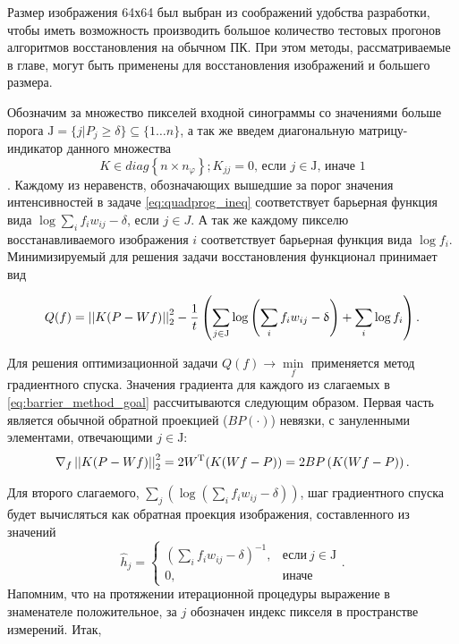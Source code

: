 Размер изображения 64х64 был выбран из соображений удобства разработки, чтобы иметь возможность производить большое количество тестовых прогонов алгоритмов восстановления на обычном ПК.
При этом методы, рассматриваемые в главе, могут быть применены для восстановления изображений и большего размера.


Обозначим за множество пикселей входной синограммы со значениями больше порога $\mathrm J = \{j | P_j \geq \delta \} \subseteq \{1 \dots n\}$, а так же введем диагональную матрицу-индикатор данного множества 
$$
K \in diag\left\{n \times n_\varphi\right\}; K_{jj} = 0 \text{, если\ } j \in \mathrm J \text{, иначе\ } 1
$$.
Каждому из неравенств, обозначающих вышедшие за порог значения интенсивностей в задаче \eqref{eq:quadprog_ineq} соответствует барьерная функция вида $\log{\sum_i f_{i} w_{ij} - \delta}$, если $j \in J$. 
А так же каждому пикселю восстанавливаемого изображения $i$ соответствует барьерная функция вида $\log{f_i}$.
Минимизируемый для решения задачи восстановления функционал принимает вид

\begin{equation}
\label{eq:barrier_method_goal}
  Q(f) = \left|\left| K(P - Wf) \right|\right|_2^2 - 
  \frac 1 t \left( 
    \sum_{j \in \mathrm J}{
      \log{\left(\sum_i {f_i w_{ij} - \updelta} \right)}
    }
    +
    \sum_{i}{
      \log{f_i}
    }
  \right).
\end{equation}

Для решения оптимизационной задачи $Q(f) \rightarrow \min\limits_f$ применяется метод градиентного спуска.
Значения градиента для каждого из слагаемых в \eqref{eq:barrier_method_goal} рассчитываются следующим образом. 
Первая часть является обычной обратной проекцией ($BP(\cdot)$) невязки, с зануленными элементами, отвечающими $j \in \mathrm J$:
$$
\nabla_f \left|\left| K(P - Wf) \right|\right|_2^2 = 2 W ^ {\mathrm T} (K(Wf - P)) = 
  2 BP\left(K(Wf-P)\right).
$$

Для второго слагаемого, $\sum_j {\left(\log{\left(\sum_i {f_i w_{ij} - \delta} \right)}\right)}$, шаг градиентного спуска будет вычисляться как обратная проекция изображения, составленного из значений 
$$
\hat{h}_j = 
  \begin{cases}
    \left(\sum_i {f_i w_{ij}} - \delta \right)^{-1}, & \text{если}\ j \in \mathrm J \\
    0, & \text{иначе}
  \end{cases}.
$$
Напомним, что на протяжении итерационной процедуры выражение в знаменателе положительное, за $j$ обозначен индекс пикселя в пространстве измерений.
Итак,

